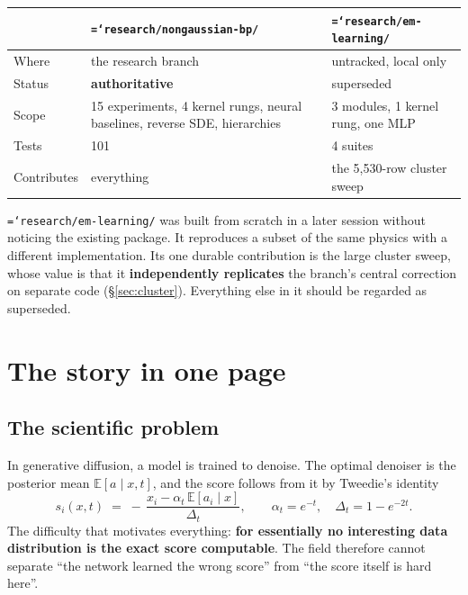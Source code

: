 \documentclass[11pt,a4paper]{article}
\newcommand{\code}[1]{\texttt{\small\hyphenchar\font=`\-\relax #1}}
\begin{document}
\begin{center}
\begin{tabular}{@{}p{4.6cm}p{5.1cm}p{5.5cm}@{}}
\toprule
& \textbf{\code{research/nongaussian-bp/}} & \textbf{\code{research/em-learning/}} \\
\midrule
Where & the research branch & untracked, local only \\
Status & \textbf{authoritative} & superseded \\
Scope & 15 experiments, 4 kernel rungs, neural baselines, reverse SDE, hierarchies & 3 modules, 1 kernel rung, one MLP \\
Tests & 101 & 4 suites \\
Contributes & everything & the 5{,}530-row cluster sweep \\
\bottomrule
\end{tabular}
\end{center}

\noindent
\code{research/em-learning/} was built from scratch in a later session without noticing the
existing package. It reproduces a subset of the same physics with a different
implementation. Its one durable contribution is the large cluster sweep, whose value is
that it \textbf{independently replicates} the branch's central correction on separate code
(\S\ref{sec:cluster}). Everything else in it should be regarded as superseded.

\newpage
\section{The story in one page}
\label{sec:arc}

\subsection{The scientific problem}

In generative diffusion, a model is trained to denoise. The optimal denoiser is the
posterior mean $\mathbb{E}[a \mid x, t]$, and the score follows from it by Tweedie's
identity
\[
s_i(x,t) \;=\; -\,\frac{x_i - \alpha_t\, \mathbb{E}[a_i \mid x]}{\Delta_t},
\qquad \alpha_t = e^{-t}, \quad \Delta_t = 1 - e^{-2t}.
\]
The difficulty that motivates everything: \textbf{for essentially no interesting data
distribution is the exact score computable}. The field therefore cannot separate
``the network learned the wrong score'' from ``the score itself is hard here''.
\end{document}
